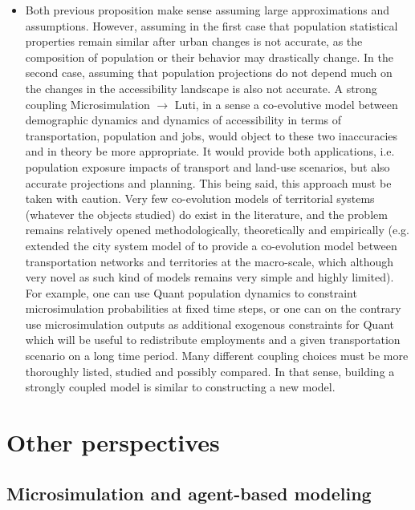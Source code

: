 \documentclass[11pt]{article}
\begin{document}
\begin{itemize}
	\item Both previous proposition make sense assuming large approximations and assumptions. However, assuming in the first case that population statistical properties remain similar after urban changes is not accurate, as the composition of population or their behavior may drastically change. In the second case, assuming that population projections do not depend much on the changes in the accessibility landscape is also not accurate. A strong coupling Microsimulation $\rightarrow$ Luti, in a sense a co-evolutive model between  demographic dynamics and dynamics of accessibility in terms of transportation, population and jobs, would object to these two inaccuracies and in theory be more appropriate. It would provide both applications, i.e. population exposure impacts of transport and land-use scenarios, but also accurate projections and planning. This being said, this approach must be taken with caution. Very few co-evolution models of territorial systems (whatever the objects studied) do exist in the literature, and the problem remains relatively opened methodologically, theoretically and empirically (e.g. \cite{raimbault2018modeling} extended the city system model of \cite{raimbault2018indirect} to provide a co-evolution model between transportation networks and territories at the macro-scale, which although very novel as such kind of models remains very simple and highly limited). For example, one can use Quant population dynamics to constraint microsimulation probabilities at fixed time steps, or one can on the contrary use microsimulation outputs as additional exogenous constraints for Quant which will be useful to redistribute employments and a given transportation scenario on a long time period. Many different coupling choices must be more thoroughly listed, studied and possibly compared. In that sense, building a strongly coupled model is similar to constructing a new model.
\end{itemize}


\section{Other perspectives}


\subsection{Microsimulation and agent-based modeling}
\end{document}
